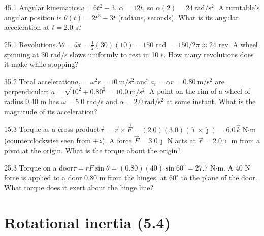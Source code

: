 \documentclass[11pt]{article}
\begin{document}
\begin{q}{4}{5.1 Angular kinematics}{$\omega = 6t^2 - 3$, $\alpha = 12t$, so $\alpha(2) = 24\ \mathrm{rad/s^2}$.}
A turntable's angular position is $\theta(t) = 2t^3 - 3t$ (radians, seconds). What is its angular acceleration at $t = 2.0$ s?
\end{q}
\begin{q}{2}{5.1 Revolutions}{$\Delta\theta = \bar\omega t = \tfrac12(30)(10) = 150$ rad $= 150/2\pi \approx 24$ rev.}
A wheel spinning at 30 rad/s slows uniformly to rest in 10 s. How many revolutions does it make while stopping?
\end{q}
\begin{q}{3}{5.2 Total acceleration}{$a_c = \omega^2 r = 10\ \mathrm{m/s^2}$ and $a_t = \alpha r = 0.80\ \mathrm{m/s^2}$ are perpendicular: $a = \sqrt{10^2 + 0.80^2} = 10.0\ \mathrm{m/s^2}$.}
A point on the rim of a wheel of radius 0.40 m has $\omega = 5.0$ rad/s and $\alpha = 2.0\ \mathrm{rad/s^2}$ at some instant. What is the magnitude of its acceleration?
\end{q}
\begin{q}{1}{5.3 Torque as a cross product}{$\vec\tau = \vec r\times\vec F = (2.0)(3.0)(\hat\imath\times\hat\jmath) = 6.0\,\hat k$ N$\cdot$m (counterclockwise seen from $+z$).}
A force $\vec F = 3.0\,\hat\jmath$ N acts at $\vec r = 2.0\,\hat\imath$ m from a pivot at the origin. What is the torque about the origin?
\end{q}
\begin{q}{2}{5.3 Torque on a door}{$\tau = rF\sin\theta = (0.80)(40)\sin 60^\circ = 27.7$ N$\cdot$m.}
A 40 N force is applied to a door 0.80 m from the hinges, at $60^\circ$ to the plane of the door. What torque does it exert about the hinge line?
\end{q}

\section{Rotational inertia (5.4)}
\end{document}
